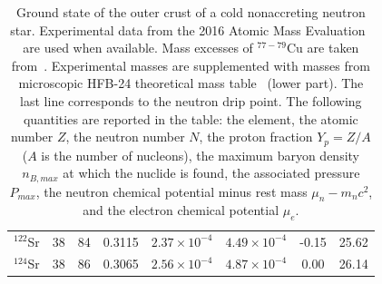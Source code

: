 \begin{table}[!t]
\begin{center}
\begin{tabular}{cccccccc}
  $^{122}$Sr & 38  & 84  & 0.3115 & $2.37\times 10^{-4}$ & $4.49\times 10^{-4}$
            & -0.15 & 25.62 \\
  $^{124}$Sr & 38  & 86  & 0.3065 & $2.56\times 10^{-4}$ & $4.87\times 10^{-4}$
            & 0.00 & 26.14 \\
  \bottomrule
  \bottomrule
\end{tabular}
\end{center}
\caption[Ground state of the outer crust]{Ground state of the outer crust of a 
  cold nonaccreting neutron star. 
Experimental data from the 2016 Atomic Mass Evaluation~\cite{Huang2017} are
used when available. Mass excesses of
$^{77-79}$Cu are taken from~\cite{Welker2017}. Experimental masses are 
supplemented with masses from
microscopic HFB-24 theoretical mass table~\cite{Goriely2013} (lower part). The
last line corresponds to the neutron drip point. The following quantities are
reported in the table: the element, the atomic number $Z$, the neutron number
$N$, the proton fraction $Y_p = Z/A$ ($A$ is the number of nucleons), the 
maximum baryon density $n_{B,max}$ at
which the nuclide is found, the associated pressure $P_{max}$, the neutron
chemical potential minus rest mass $\mu_n - m_nc^2$, and the electron chemical
potential $\mu_e$.}\label{table:ocrust} 
\end{table}

